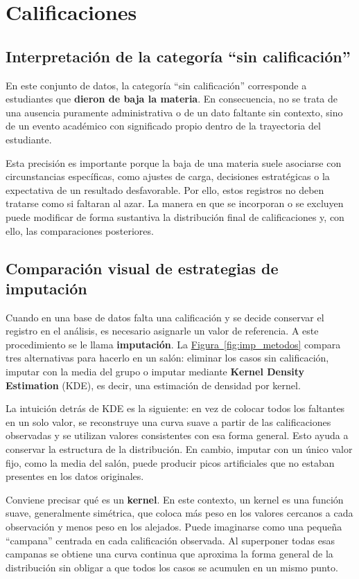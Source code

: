 \documentclass[8pt,a4paper]{article} %
\numberwithin{figure}{subsection}
\begin{document}
\FloatBarrier
\newpage
\section{Calificaciones}

\subsection{Interpretación de la categoría ``sin calificación''}
En este conjunto de datos, la categoría ``sin calificación'' corresponde a estudiantes que \textbf{dieron de baja la materia}. En consecuencia, no se trata de una ausencia puramente administrativa o de un dato faltante sin contexto, sino de un evento académico con significado propio dentro de la trayectoria del estudiante.

Esta precisión es importante porque la baja de una materia suele asociarse con circunstancias específicas, como ajustes de carga, decisiones estratégicas o la expectativa de un resultado desfavorable. Por ello, estos registros no deben tratarse como si faltaran al azar. La manera en que se incorporan o se excluyen puede modificar de forma sustantiva la distribución final de calificaciones y, con ello, las comparaciones posteriores.

\subsection{Comparación visual de estrategias de imputación}
Cuando en una base de datos falta una calificación y se decide conservar el registro en el análisis, es necesario asignarle un valor de referencia. A este procedimiento se le llama \textbf{imputación}. La \hyperref[fig:imp_metodos]{Figura~\ref{fig:imp_metodos}} compara tres alternativas para hacerlo en un salón: eliminar los casos sin calificación, imputar con la media del grupo o imputar mediante \textbf{Kernel Density Estimation} (KDE), es decir, una estimación de densidad por kernel.

La intuición detrás de KDE es la siguiente: en vez de colocar todos los faltantes en un solo valor, se reconstruye una curva suave a partir de las calificaciones observadas y se utilizan valores consistentes con esa forma general. Esto ayuda a conservar la estructura de la distribución. En cambio, imputar con un único valor fijo, como la media del salón, puede producir picos artificiales que no estaban presentes en los datos originales.

Conviene precisar qué es un \textbf{kernel}. En este contexto, un kernel es una función suave, generalmente simétrica, que coloca más peso en los valores cercanos a cada observación y menos peso en los alejados. Puede imaginarse como una pequeña ``campana'' centrada en cada calificación observada. Al superponer todas esas campanas se obtiene una curva continua que aproxima la forma general de la distribución sin obligar a que todos los casos se acumulen en un mismo punto.
\end{document}
